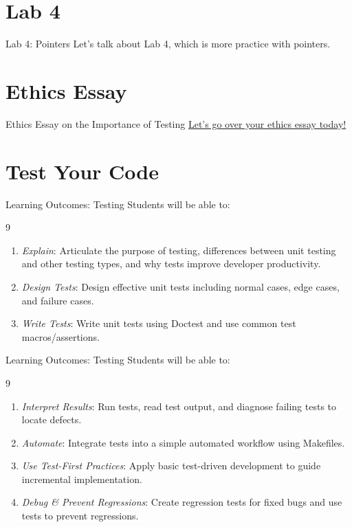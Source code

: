 \documentclass[14pt,aspectratio=1610]{beamer}
\begin{document}
\section*{Lab 4}
\begin{frame}{Lab 4: Pointers}
\centering\Large
Let's talk about Lab 4, which is more practice with pointers.
\end{frame}


\section*{Ethics Essay}

\begin{frame}{Ethics Essay on the Importance of Testing}
\centering\Large
\href{https://github.com/csu-cs/CSCI-315-2026-Spring/blob/master/ethics/README.md}{Let's go over your ethics essay today!}
\end{frame}

\section{Test Your Code}

\begin{frame}{Learning Outcomes: Testing}
  Students will be able to:
  \begin{overlayarea}{\linewidth}{9\baselineskip}
    \begin{enumerate}
      \item \emph{Explain}: Articulate the purpose of testing, differences between unit testing and other testing types, and why tests improve developer productivity.
      \item \emph{Design Tests}: Design effective unit tests including normal cases, edge cases, and failure cases.
      \item \emph{Write Tests}: Write unit tests using Doctest and use common test macros/assertions.
    \end{enumerate}
  \end{overlayarea}
\end{frame}

\begin{frame}{Learning Outcomes: Testing}
  Students will be able to:
  \begin{overlayarea}{\linewidth}{9\baselineskip}

    \begin{enumerate}\addtocounter{enumi}{3}
      \item \emph{Interpret Results}: Run tests, read test output, and diagnose failing tests to locate defects.
      \item \emph{Automate}: Integrate tests into a simple automated workflow using Makefiles.
      \item \emph{Use Test-First Practices}: Apply basic test-driven development to guide incremental implementation.
      \item \emph{Debug \& Prevent Regressions}: Create regression tests for fixed bugs and use tests to prevent regressions.
    \end{enumerate}
\end{overlayarea}
\end{frame}
\end{document}

